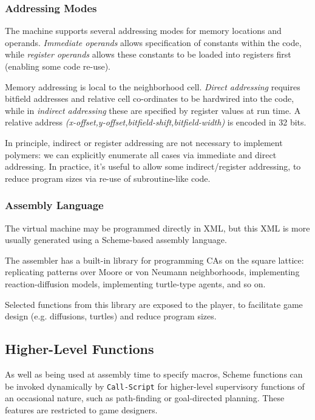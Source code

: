\documentclass{acm_proc_article-sp}
\begin{document}
\subsubsection{Addressing Modes}

The machine supports several addressing modes for memory locations and operands.
{\em Immediate operands} allows specification of constants within the code,
while {\em register operands} allows these constants to be loaded into registers first (enabling some code re-use).

Memory addressing is local to the neighborhood cell.
{\em Direct addressing} requires bitfield addresses and relative cell co-ordinates to be hardwired into the code,
while in {\em indirect addressing} these are specified by register values at run time.
A relative address {\em (x-offset,y-offset,bitfield-shift,bitfield-width)} is encoded in 32 bits.

In principle, indirect or register addressing are not necessary to implement polymers:
we can explicitly enumerate all cases via immediate and direct addressing.
In practice, it's useful to allow some indirect/register addressing,
to reduce program sizes via re-use of subroutine-like code.

\subsubsection{Assembly Language}

The virtual machine may be programmed directly in XML, but this XML is more usually generated using
a Scheme-based assembly language.

The assembler has a built-in library for programming CAs on the square lattice:
replicating patterns over Moore or von Neumann neighborhoods,
implementing reaction-diffusion models, implementing turtle-type agents, and so on.

Selected functions from this library are exposed to the player,
to facilitate game design (e.g. diffusions, turtles) and reduce program sizes.

\subsection{Higher-Level Functions}

As well as being used at assembly time to specify macros,
Scheme functions can be invoked dynamically by {\tt Call-Script}
for higher-level supervisory functions of an occasional nature,
such as path-finding or goal-directed planning.
These features are restricted to game designers.
\end{document}

